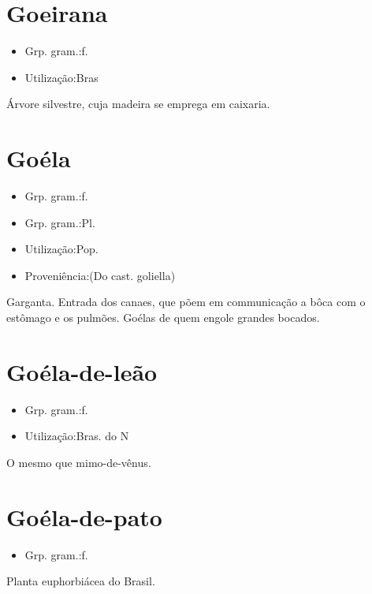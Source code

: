 \section{Goeirana}
\begin{itemize}
\item {Grp. gram.:f.}
\end{itemize}
\begin{itemize}
\item {Utilização:Bras}
\end{itemize}
Árvore silvestre, cuja madeira se emprega em caixaria.
\section{Goéla}
\begin{itemize}
\item {Grp. gram.:f.}
\end{itemize}
\begin{itemize}
\item {Grp. gram.:Pl.}
\end{itemize}
\begin{itemize}
\item {Utilização:Pop.}
\end{itemize}
\begin{itemize}
\item {Proveniência:(Do cast. \textunderscore goliella\textunderscore )}
\end{itemize}
Garganta.
Entrada dos canaes, que põem em communicação a bôca com o estômago e os pulmões.
Goélas de quem engole grandes bocados.
\section{Goéla-de-leão}
\begin{itemize}
\item {Grp. gram.:f.}
\end{itemize}
\begin{itemize}
\item {Utilização:Bras. do N}
\end{itemize}
O mesmo que \textunderscore mimo-de-vênus\textunderscore .
\section{Goéla-de-pato}
\begin{itemize}
\item {Grp. gram.:f.}
\end{itemize}
Planta euphorbiácea do Brasil.
